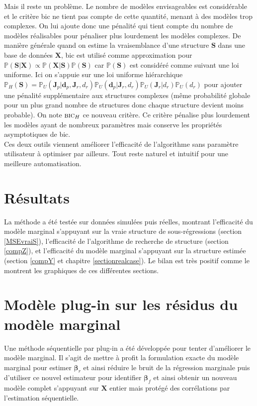 \documentclass[12pt,a4paper]{report}
\begin{document}
		Mais il reste un problème. Le nombre de modèles envisageables est considérable et le critère {\sc bic} ne tient pas compte de cette quantité, menant à des modèles trop complexes. On lui ajoute donc une pénalité qui tient compte du nombre de modèles réalisables pour pénaliser plus lourdement les modèles complexes.
	De manière générale quand on estime la vraisemblance d'une structure $\boldsymbol{S}$ dans une base de données $\boldsymbol{X}$, {\sc bic} est utilisé comme approximation pour $\mathbb{P}(\boldsymbol{S}|\boldsymbol{X})\propto  \mathbb{P}(\boldsymbol{X}|\boldsymbol{S})\mathbb{P}(\boldsymbol{S})$  	car $\mathbb{P}(\boldsymbol{S})$ est considéré comme suivant une loi uniforme. Ici on s'appuie sur une loi uniforme hiérarchique $\mathbb{P}_{H}(\boldsymbol{S})=\mathbb{P}_{U}(\boldsymbol{J}_p | \boldsymbol{d}_p,\boldsymbol{J}_r,d_r)\mathbb{P}_{U}(\boldsymbol{d}_p|\boldsymbol{J}_r,d_r)\mathbb{P}_{U}(\boldsymbol{J}_r|d_r)\mathbb{P}_{U}(d_r)$ pour ajouter une pénalité supplémentaire aux structures complexes (même probabilité globale pour un plus grand nombre de structures donc chaque structure devient moins probable). 
On note $\mbox{{\sc bic}}_H$ ce nouveau critère. Ce critère pénalise plus lourdement les modèles ayant de nombreux paramètres mais conserve les propriétés asymptotiques de {\sc bic}.\\

	Ces deux outils viennent améliorer l'efficacité de l'algorithme sans paramètre utilisateur à optimiser par ailleurs. Tout reste naturel et intuitif pour une meilleure automatisation.

	\section{Résultats}
		La méthode a été testée sur données simulées puis réelles, montrant l'efficacité du modèle marginal s'appuyant sur la vraie structure de sous-régressions (section \ref{MSEvraiS}), l'efficacité de l'algorithme de recherche de structure (section \ref{compZ}), et l'efficacité du modèle marginal s'appuyant sur la structure estimée (section \ref{compY} et chapitre \ref{sectionrealcase}). Le bilan est très positif comme le montrent les graphiques de ces différentes sections.
	\section{Modèle plug-in sur les résidus du modèle marginal}
		Une méthode séquentielle par plug-in a été développée pour tenter d'améliorer le modèle marginal. Il s'agit de mettre à profit la formulation exacte du modèle marginal pour estimer $\boldsymbol{\beta}_r$ et ainsi réduire le bruit de la régression marginale puis d'utiliser ce nouvel estimateur pour identifier $\boldsymbol{\beta}_f$ et ainsi obtenir un nouveau modèle complet s'appuyant sur $\boldsymbol{X}$ entier mais protégé des corrélations par l'estimation séquentielle.\\
		
\end{document}
